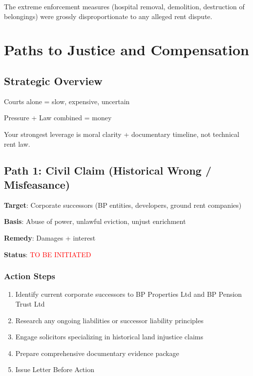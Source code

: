 \documentclass[11pt,a4paper]{article}
\begin{document}
The extreme enforcement measures (hospital removal, demolition, destruction of belongings) were grossly disproportionate to any alleged rent dispute.

\newpage

\section{Paths to Justice and Compensation}

\subsection{Strategic Overview}

\begin{tcolorbox}[colback=blue!5,colframe=darkblue,title=\textbf{Strategic Reality}]
Courts alone = slow, expensive, uncertain

Pressure + Law combined = money

Your strongest leverage is moral clarity + documentary timeline, not technical rent law.
\end{tcolorbox}

\subsection{Path 1: Civil Claim (Historical Wrong / Misfeasance)}

\begin{action}
\textbf{Target}: Corporate successors (BP entities, developers, ground rent companies)

\textbf{Basis}: Abuse of power, unlawful eviction, unjust enrichment

\textbf{Remedy}: Damages + interest

\textbf{Status}: \textcolor{red}{TO BE INITIATED}
\end{action}

\subsubsection{Action Steps}
\begin{enumerate}[label=\arabic*.]
    \item Identify current corporate successors to BP Properties Ltd and BP Pension Trust Ltd
    \item Research any ongoing liabilities or successor liability principles
    \item Engage solicitors specializing in historical land injustice claims
    \item Prepare comprehensive documentary evidence package
    \item Issue Letter Before Action
\end{enumerate}
\end{document}
